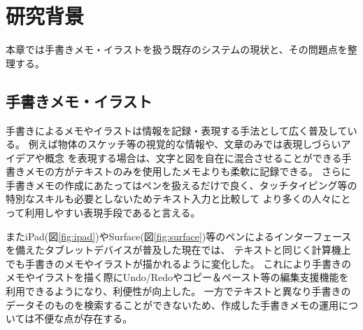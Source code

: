 \chapter{研究背景}
\label{chap:haikei}

本章では手書きメモ・イラストを扱う既存のシステムの現状と、その問題点を整理する。

\newpage

\section{手書きメモ・イラスト}
手書きによるメモやイラストは情報を記録・表現する手法として広く普及している。
例えば物体のスケッチ等の視覚的な情報や、文章のみでは表現しづらいアイデアや概念
を表現する場合は、文字と図を自在に混合させることができる手書きメモの方がテキストのみを使用したメモよりも柔軟に記録できる。
さらに手書きメモの作成にあたってはペンを扱えるだけで良く、タッチタイピング等の特別なスキルも必要としないためテキスト入力と比較して
より多くの人々にとって利用しやすい表現手段であると言える。

またiPad(図\ref{fig:ipad})やSurface(図\ref{fig:surface})等のペンによるインターフェースを備えたタブレットデバイスが普及した現在では、
テキストと同じく計算機上でも手書きのメモやイラストが描かれるように変化した。
これにより手書きのメモやイラストを描く際にUndo/Redoやコピー＆ペースト等の編集支援機能を利用できるようになり、利便性が向上した。
一方でテキストと異なり手書きのデータそのものを検索することができないため、作成した手書きメモの運用については不便な点が存在する。

